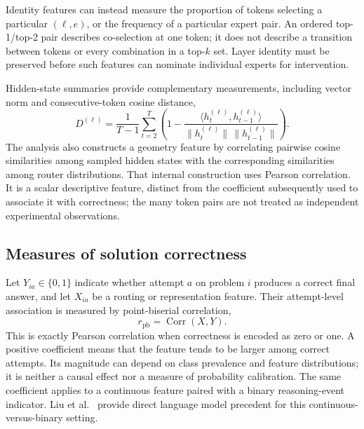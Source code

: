 \documentclass[12pt,a4paper,twoside,openright]{book}
\begin{document}
Identity features can instead measure the proportion of tokens selecting a
particular $(\ell,e)$, or the frequency of a particular expert pair.
An ordered top-1/top-2 pair describes co-selection at one token; it does not
describe a transition between tokens or every combination in a top-$k$ set.
Layer identity must be preserved before such features can nominate individual
experts for intervention.

Hidden-state summaries provide complementary measurements, including vector
norm and consecutive-token cosine distance,
\begin{equation}
  D^{(\ell)}=\frac{1}{T-1}\sum_{t=2}^{T}
  \left(1-\frac{\langle h_t^{(\ell)},h_{t-1}^{(\ell)}\rangle}
  {\|h_t^{(\ell)}\|\,\|h_{t-1}^{(\ell)}\|}\right).
  \label{eq:hidden-distance}
\end{equation}
The analysis also constructs a geometry feature by correlating pairwise
cosine similarities among sampled hidden states with the corresponding
similarities among router distributions. That internal construction uses
Pearson correlation. It is a scalar descriptive feature, distinct from the
coefficient subsequently used to associate it with correctness; the many
token pairs are not treated as independent experimental observations.

\subsection{Measures of solution correctness}

Let $Y_{ia}\in\{0,1\}$ indicate whether attempt $a$ on problem $i$ produces
a correct final answer, and let $X_{ia}$ be a routing or representation
feature. Their attempt-level association is measured by point-biserial
correlation,
\begin{equation}
  r_{\mathrm{pb}}=\operatorname{Corr}(X,Y).
  \label{eq:point-biserial}
\end{equation}
This is exactly Pearson correlation when correctness is encoded as zero or
one. A positive coefficient means that the feature tends to be larger among
correct attempts. Its magnitude can depend on class prevalence and feature
distributions; it is neither a causal effect nor a measure of probability
calibration. The same coefficient applies to a continuous feature paired
with a binary reasoning-event indicator. Liu et al.~\cite{liu2022figurative}
provide direct language model precedent for this continuous-versus-binary setting.
\end{document}
